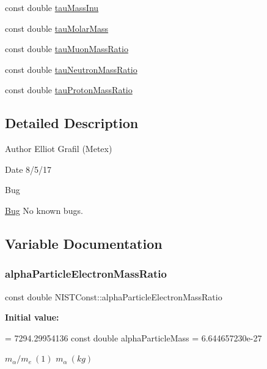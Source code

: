 \begin{DoxyCompactItemize}
const double \hyperlink{namespace_n_i_s_t_const_aa0a5019135251853d2761cb9af892aea}{tau\+Mass\+Inu}
\item 
const double \hyperlink{namespace_n_i_s_t_const_a07e317845454c4534cc0273efa2e55c6}{tau\+Molar\+Mass}
\item 
const double \hyperlink{namespace_n_i_s_t_const_ac648100c94ae427f98a87390a9263379}{tau\+Muon\+Mass\+Ratio}
\item 
const double \hyperlink{namespace_n_i_s_t_const_a024557c365e76b225bef98f0a0a9283b}{tau\+Neutron\+Mass\+Ratio}
\item 
const double \hyperlink{namespace_n_i_s_t_const_a07236b2b11bdbfaee49e581a44bb01e8}{tau\+Proton\+Mass\+Ratio}
\end{DoxyCompactItemize}


\subsection{Detailed Description}
\begin{DoxyAuthor}{Author}
Elliot Grafil (Metex) 
\end{DoxyAuthor}
\begin{DoxyDate}{Date}
8/5/17 
\end{DoxyDate}
\begin{DoxyRefDesc}{Bug}
\item[\hyperlink{bug__bug000001}{Bug}]No known bugs. \end{DoxyRefDesc}


\subsection{Variable Documentation}
\mbox{\label{namespace_n_i_s_t_const_a9f00b32c60f1bc5b8a950b58e64d08c8}} 
\subsubsection{\texorpdfstring{alpha\+Particle\+Electron\+Mass\+Ratio}{alphaParticleElectronMassRatio}}
{\footnotesize\ttfamily const double N\+I\+S\+T\+Const\+::alpha\+Particle\+Electron\+Mass\+Ratio}

{\bfseries Initial value\+:}
\begin{DoxyCode}
=                           7294.29954136 
    \textcolor{keyword}{const} \textcolor{keywordtype}{double} alphaParticleMass =                                        6.644657230e-27
\end{DoxyCode}
$m_\alpha/m_e \ (1)$ $m_\alpha \ (kg)$ \mbox{\label{namespace_n_i_s_t_const_a4a65b49a93c81dff12ac24366f68e4e9}} 
